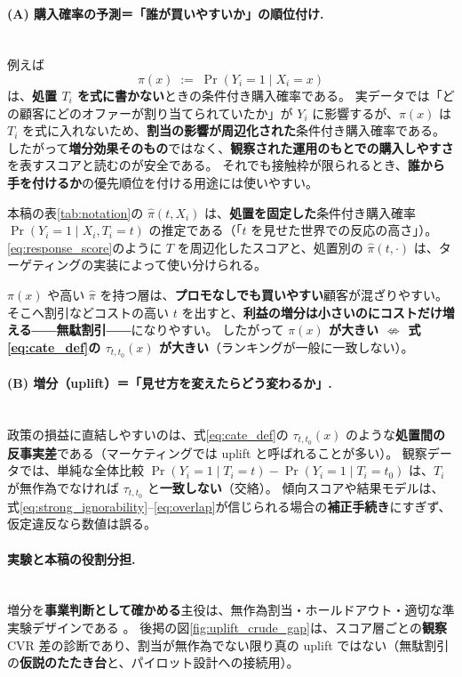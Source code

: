 \documentclass[11pt,a4paper]{article}
\newcommand{\pihat}{\hat{\pi}}
\begin{document}
\paragraph{(A) 購入確率の予測＝「誰が買いやすいか」の順位付け.}\mbox{}\\
例えば
\begin{equation}
  \pi(x) \;:=\; \Pr(Y_i=1 \mid X_i=x)
  \label{eq:response_score}
\end{equation}
は、\textbf{処置 $T_i$ を式に書かない}ときの条件付き購入確率である。
実データでは「どの顧客にどのオファーが割り当てられていたか」が $Y_i$ に影響するが、$\pi(x)$ は $T_i$ を式に入れないため、\textbf{割当の影響が周辺化された}条件付き購入確率である。
したがって\textbf{増分効果そのもの}ではなく、\textbf{観察された運用のもとでの購入しやすさ}を表すスコアと読むのが安全である。
それでも接触枠が限られるとき、\textbf{誰から手を付けるか}の優先順位を付ける用途には使いやすい。

本稿の表\ref{tab:notation}の $\pihat(t,X_i)$ は、\textbf{処置を固定した}条件付き購入確率 $\Pr(Y_i=1\mid X_i,T_i=t)$ の推定である（「$t$ を見せた世界での反応の高さ」）。
\eqref{eq:response_score}のように $T$ を周辺化したスコアと、処置別の $\pihat(t,\cdot)$ は、ターゲティングの実装によって使い分けられる。

$\pi(x)$ や高い $\pihat$ を持つ層は、\textbf{プロモなしでも買いやすい}顧客が混ざりやすい。
そこへ割引などコストの高い $t$ を出すと、\textbf{利益の増分は小さいのにコストだけ増える}――\textbf{無駄割引}――になりやすい。
したがって \textbf{$\pi(x)$ が大きい $\not\Leftrightarrow$ 式\eqref{eq:cate_def}の $\tau_{t,t_0}(x)$ が大きい}（ランキングが一般に一致しない）。

\paragraph{(B) 増分（uplift）＝「見せ方を変えたらどう変わるか」.}\mbox{}\\
政策の損益に直結しやすいのは、式\eqref{eq:cate_def}の $\tau_{t,t_0}(x)$ のような\textbf{処置間の反事実差}である（マーケティングでは uplift と呼ばれることが多い）。
観察データでは、単純な全体比較 $\Pr(Y_i=1\mid T_i=t)-\Pr(Y_i=1\mid T_i=t_0)$ は、$T_i$ が無作為でなければ $\tau_{t,t_0}$ と\textbf{一致しない}（交絡）。
傾向スコアや結果モデルは、式\eqref{eq:strong_ignorability}--\eqref{eq:overlap}が信じられる場合の\textbf{補正手続き}にすぎず、仮定違反なら数値は誤る。

\paragraph{実験と本稿の役割分担.}\mbox{}\\
増分を\textbf{事業判断として確かめる}主役は、無作為割当・ホールドアウト・適切な準実験デザインである \cite{Kohavi2020}。
後掲の図\ref{fig:uplift_crude_gap}は、スコア層ごとの\textbf{観察}CVR 差の診断であり、割当が無作為でない限り真の uplift ではない（無駄割引の\textbf{仮説のたたき台}と、パイロット設計への接続用）。
\end{document}
